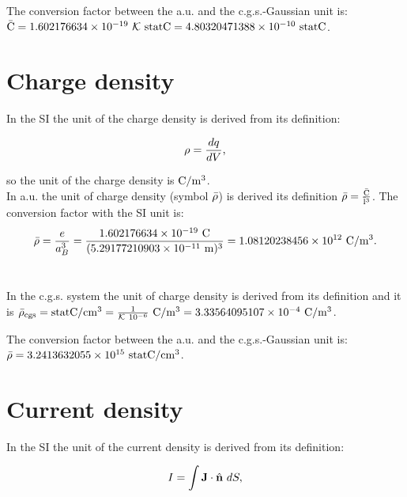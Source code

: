 \documentclass[12pt,a4paper,twoside]{report}
\def\barl{5.29177210903\times 10^{-11}}
\def\barc{1.602176634\times 10^{-19}}
\def\barrho{1.08120238456\times 10^{12}}
\def\rhotorho{3.33564095107\times 10^{-4}}
\def\barccgs{4.80320471388\times 10^{-10}}
\def\barrhocgs{3.2413632055\times 10^{15}}
\begin{document}
{{\color{green} The conversion factor between the a.u. and the 
c.g.s.-Gaussian unit is: ${\rm \bar C}=\barc\ \mathcal{K}\ {\rm statC}=
\barccgs\ {\rm statC}$. \\
}

\newpage
{\color{coral}\section{Charge density}}
\color{black}
In the SI the unit of the charge density is derived from its
definition:

\begin{tcolorbox}
\begin{equation}
\rho={dq \over dV},
\end{equation}
\end{tcolorbox}

so the unit of the charge density is ${\rm C}/{\rm m}^3$.
\\

{\color{web-blue} In a.u. the unit of charge density (symbol ${\rm \bar \rho}$) 
is derived its definition ${\rm \bar \rho} ={{\rm \bar C} \over {\rm \bar l}^3}$. The
conversion factor with the SI unit is: 
\begin{equation}
{\rm \bar \rho} = {e\over a_B^3} =
{\barc\ {\rm C}\over (\barl\ {\rm m})^3}=\barrho\ {\rm C}/{\rm m}^3. 
\end{equation}
\\
}

{\color{orange} In the c.g.s. system the unit of charge density  
is derived from its definition and it is
${\rm \bar \rho_{cgs}}={\rm statC}/{\rm cm}^3 = {1 \over \mathcal{K}\ 10^{-6}}\ {\rm C}/{\rm m}^3=\rhotorho\ {\rm C}/{\rm m}^3$.
\\
}

{\color{green} The conversion factor between the a.u. and the 
c.g.s.-Gaussian unit is: ${\rm \bar \rho} = \barrhocgs\ {\rm statC}/{\rm cm}^3$. 
\\
}

\newpage
{\color{coral}\section{Current density}}
\color{black}

In the SI the unit of the current density is derived from 
its definition:

\begin{tcolorbox}
\begin{equation}
I=\int {\bf J}\cdot \hat {\bf n}\ dS,
\end{equation}
\end{tcolorbox}

}
\end{document}
